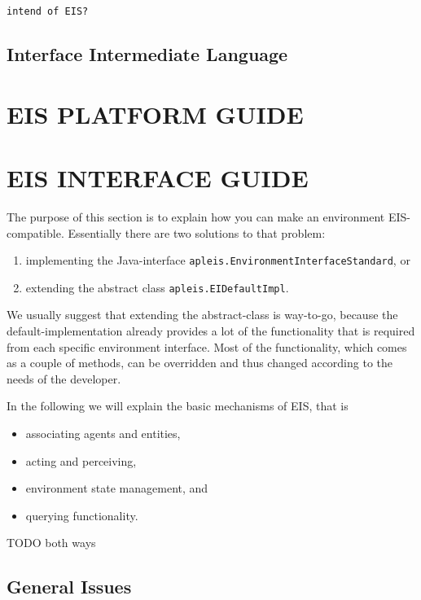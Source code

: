 \documentclass[a4]{article}
\newcommand{\EIS}{\textsf{EIS}\xspace}
\begin{document}
\begin{verbatim}
intend of EIS?
\end{verbatim}


\subsection{Interface Intermediate Language}

\section{EIS PLATFORM GUIDE}


\section{EIS INTERFACE GUIDE}

The purpose of this section is to explain how you can make an environment \EIS-compatible. 
Essentially there are two solutions to that problem:
\begin{enumerate}
\item implementing the Java-interface \texttt{apleis.EnvironmentInterfaceStandard}, or
\item extending the abstract class \texttt{apleis.EIDefaultImpl}.
\end{enumerate}

We usually suggest that extending the abstract-class is way-to-go, because the default-implementation
already provides a lot of the functionality that is required from each specific environment interface.
Most of the functionality, which comes as a couple of methods, can be overridden and thus changed
according to the needs of the developer.

In the following we will explain the basic mechanisms of \EIS, that is
\begin{itemize}
\item associating agents and entities,
\item acting and perceiving,
\item environment state management, and
\item querying functionality.
\end{itemize}

TODO both ways

\subsection{General Issues}
\end{document}
